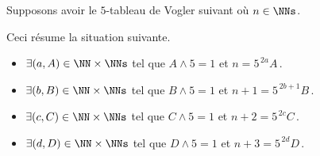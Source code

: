 \begin{example}
	Supposons avoir le $5$-tableau de Vogler suivant où $n \in \NNs$.

	\begin{center}
	\end{center}
	
	Ceci résume la situation suivante. 
	
	\begin{itemize}
		\item $\exists (a, A) \in \NN \times \NNs$
		      tel que $A \wedge 5 = 1$ et $n     = 5^{\,2a} A$\,.
		
		\item $\exists (b, B) \in \NN \times \NNs$
		      tel que $B \wedge 5 = 1$ et $n + 1 = 5^{\,2b + 1} B$\,.
		
		\item $\exists (c, C) \in \NN \times \NNs$
		      tel que $C \wedge 5 = 1$ et $n + 2 = 5^{\,2c} C$\,.
		
		\item $\exists (d, D) \in \NN \times \NNs$
		      tel que $D \wedge 5 = 1$ et $n + 3 = 5^{\,2d} D$\,.
	\end{itemize}
\end{example}




